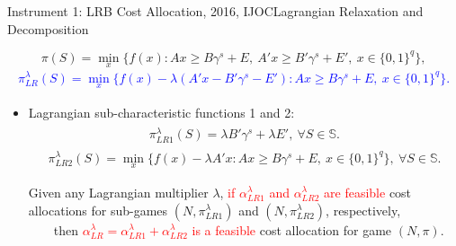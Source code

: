 \documentclass[14pt]{beamer}
\begin{document}
\begin{frame}{Instrument 1: LRB Cost Allocation, {\footnotesize 2016, IJOC}}{Lagrangian Relaxation and Decomposition}
\footnotesize
\vspace{-4mm}
\begin{shaded}
\begin{equation*}\label{eqn:orgc}
\pi(S) = \min_{x} \big\{ f(x):Ax \geq B\gamma^s + E, ~A'x \geq B'\gamma^s + E', ~x \in \{0,1\}^{q} \big\},
\end{equation*}
\vspace{-5mm}
\textcolor{blue}{
\begin{eqnarray*}
\pi_{LR}^{\lambda}(S) = \min_{x}  \{f(x)-\lambda (A'x - B'\gamma^s - E'):
       Ax \geq B\gamma^s + E, ~x \in \{0,1\}^{q}\}.
\end{eqnarray*}
}
\vspace{-5mm}
\end{shaded}
\begin{itemize}
\footnotesize
\item Lagrangian sub-characteristic functions 1 and 2:
\begin{eqnarray*}\label{eqn:subcf1}
\begin{aligned}
\pi_{LR1}^{\lambda}(S) = \lambda  B'\gamma^s + \lambda E', ~\forall S \in \mathbb{S}.
\end{aligned}
\end{eqnarray*}
 \begin{eqnarray*}
\pi_{LR2}^{\lambda}(S) = \min_x \{ f(x)-\lambda A'x: Ax \geq B\gamma^s + E, ~x \in \{0,1\}^{q} \}, ~\forall S \in \mathbb{S}.
\end{eqnarray*}
\vspace{-1em}
\begin{theorem}\label{thm:lrcostallocationfeasible}
\justifying
\rm{
Given any Lagrangian multiplier $\lambda$, \textcolor{red}{if $\alpha_{LR1}^{\lambda}$ and $\alpha_{LR2}^{\lambda}$ are feasible} cost allocations for sub-games $(N,\pi_{LR1}^{\lambda})$ and $(N,\pi_{LR2}^{\lambda})$, respectively,\\
\vspace{3mm} 
~~~~then \textcolor{red}{$\alpha_{LR}^{\lambda} = \alpha_{LR1}^{\lambda} + \alpha_{LR2}^{\lambda}$ is a feasible} cost allocation for game $(N,\pi)$.}
\end{theorem}
\end{itemize}
\end{frame}
\end{document}
